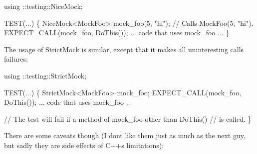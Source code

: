 \begin{DoxyCode}
using ::testing::NiceMock;

TEST(...) \{
  NiceMock<MockFoo> mock\_foo(5, "hi");  // Calls MockFoo(5, "hi").
  EXPECT\_CALL(mock\_foo, DoThis());
  ... code that uses mock\_foo ...
\}
\end{DoxyCode}


The usage of {\ttfamily Strict\+Mock} is similar, except that it makes all uninteresting calls failures\+:


\begin{DoxyCode}
using ::testing::StrictMock;

TEST(...) \{
  StrictMock<MockFoo> mock\_foo;
  EXPECT\_CALL(mock\_foo, DoThis());
  ... code that uses mock\_foo ...

  // The test will fail if a method of mock\_foo other than DoThis()
  // is called.
\}
\end{DoxyCode}


There are some caveats though (I don\textquotesingle{}t like them just as much as the next guy, but sadly they are side effects of C++\textquotesingle{}s limitations)\+:


